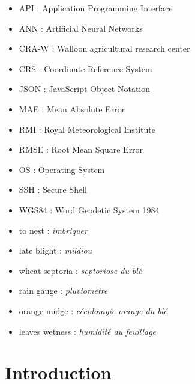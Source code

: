 \documentclass[12pt,twoside]{reedthesis}
\theoremstyle{definition}
\theoremstyle{definition}
\theoremstyle{definition}
\theoremstyle{remark}
\begin{document}
  \begin{abbreviations}
    \begin{itemize}
    \item
      API : Application Programming Interface
    \item
      ANN : Artificial Neural Networks
    \item
      CRA-W : Walloon agricultural research center
    \item
      CRS : Coordinate Reference System
    \item
      JSON : JavaScript Object Notation
    \item
      MAE : Mean Absolute Error
    \item
      RMI : Royal Meteorological Institute
    \item
      RMSE : Root Mean Square Error
    \item
      OS : Operating System
    \item
      SSH : Secure Shell
    \item
      WGS84 : Word Geodetic System 1984
    \end{itemize}
  \end{abbreviations}
  \begin{definitions}
    \begin{itemize}
    \item
      to nest : \emph{imbriquer}
    \item
      late blight : \emph{mildiou}
    \item
      wheat septoria : \emph{septoriose du blé}
    \item
      rain gauge : \emph{pluviomètre}
    \item
      orange midge : \emph{cécidomyie orange du blé}
    \item
      leaves wetness : \emph{humidité du feuillage}
    \end{itemize}
  \end{definitions}
  \printindex

  \listoffigures

  \listoftables

  \hypersetup{linkcolor=black}
  \setcounter{tocdepth}{2}
  \tableofcontents

\mainmatter %
\pagestyle{fancyplain} %

\chapter*{Introduction}\label{introduction}
\end{document}
